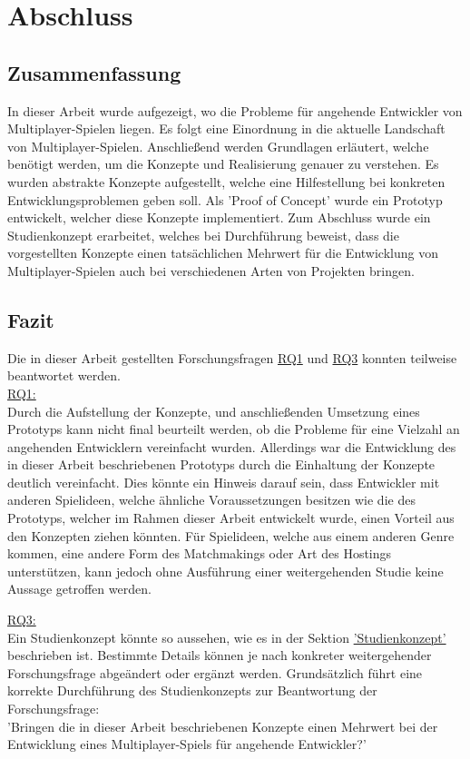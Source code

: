 \chapter{Abschluss}
\label{sec:abschluss}

\section{Zusammenfassung}

In dieser Arbeit wurde aufgezeigt, wo die Probleme für angehende Entwickler von Multiplayer-Spielen liegen. Es folgt eine Einordnung in die aktuelle Landschaft von Multiplayer-Spielen. Anschließend werden Grundlagen erläutert, welche benötigt werden, um die Konzepte und Realisierung genauer zu verstehen. Es wurden abstrakte Konzepte aufgestellt, welche eine Hilfestellung bei konkreten Entwicklungsproblemen geben soll. Als 'Proof of Concept' wurde ein Prototyp entwickelt, welcher diese Konzepte implementiert. Zum Abschluss wurde ein Studienkonzept erarbeitet, welches bei Durchführung beweist, dass die vorgestellten Konzepte einen tatsächlichen Mehrwert für die Entwicklung von Multiplayer-Spielen auch bei verschiedenen Arten von Projekten bringen.

\section{Fazit}

Die in dieser Arbeit gestellten Forschungsfragen \hyperref[RQ1]{RQ1} und \hyperref[RQ3]{RQ3} konnten teilweise beantwortet werden. \\
\hyperref[RQ1]{RQ1:} \\
Durch die Aufstellung der Konzepte, und anschließenden Umsetzung eines Prototyps kann nicht final beurteilt werden, ob die Probleme für eine Vielzahl an angehenden Entwicklern vereinfacht wurden. Allerdings war die Entwicklung des in dieser Arbeit beschriebenen Prototyps durch die Einhaltung der Konzepte deutlich vereinfacht. Dies könnte ein Hinweis darauf sein, dass Entwickler mit anderen Spielideen, welche ähnliche Voraussetzungen besitzen wie die des Prototyps, welcher im Rahmen dieser Arbeit entwickelt wurde, einen Vorteil aus den Konzepten ziehen könnten. Für Spielideen, welche aus einem anderen Genre kommen, eine andere Form des Matchmakings oder Art des Hostings unterstützen, kann jedoch ohne Ausführung einer weitergehenden Studie keine Aussage getroffen werden.

\hyperref[RQ3]{RQ3:} \\
Ein Studienkonzept könnte so aussehen, wie es in der Sektion \hyperref[studienkonzept]{'Studienkonzept'} beschrieben ist. Bestimmte Details können je nach konkreter weitergehender Forschungsfrage abgeändert oder ergänzt werden. Grundsätzlich führt eine korrekte Durchführung des Studienkonzepts zur Beantwortung der Forschungsfrage: \\
'Bringen die in dieser Arbeit beschriebenen Konzepte einen Mehrwert bei der Entwicklung eines Multiplayer-Spiels für angehende Entwickler?'

